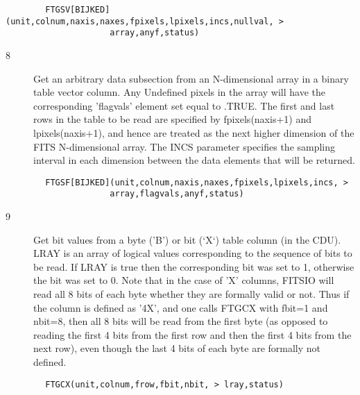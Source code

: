 \documentclass[11pt]{book}
\begin{document}
\begin{verbatim}
        FTGSV[BIJKED](unit,colnum,naxis,naxes,fpixels,lpixels,incs,nullval, >
                     array,anyf,status)
\end{verbatim}

\begin{description}
\item[8 ] Get an arbitrary data subsection from an N-dimensional array
    in a binary table vector column.  Any Undefined
    pixels in the array will have the corresponding 'flagvals'
    element set equal to .TRUE.   The first and last rows in the table
    to be read are specified by fpixels(naxis+1) and lpixels(naxis+1),
    and hence are treated as the next higher dimension of the FITS
    N-dimensional array.  The INCS parameter specifies the sampling
    interval in each dimension between the data elements that will be
   returned.
\end{description}

\begin{verbatim}
        FTGSF[BIJKED](unit,colnum,naxis,naxes,fpixels,lpixels,incs, >
                     array,flagvals,anyf,status)
\end{verbatim}

\begin{description}
\item[9 ] Get bit values from a byte ('B') or bit (`X`) table column (in the
    CDU).  LRAY is an array of logical values corresponding to the
    sequence of bits to be read.  If LRAY is true then the
    corresponding bit was set to 1, otherwise the bit was set to 0.
    Note that in the case of 'X' columns, FITSIO will read  all 8 bits
    of each byte whether they are formally valid or not.  Thus if the
    column is defined as '4X', and one calls FTGCX with  fbit=1 and
    nbit=8, then all 8 bits will be read from the first byte (as
    opposed to reading the first 4 bits from the first row and then the
    first 4 bits from the next row), even though the last 4 bits of
   each byte are formally not defined.
\end{description}

\begin{verbatim}
        FTGCX(unit,colnum,frow,fbit,nbit, > lray,status)
\end{verbatim}
\end{document}
